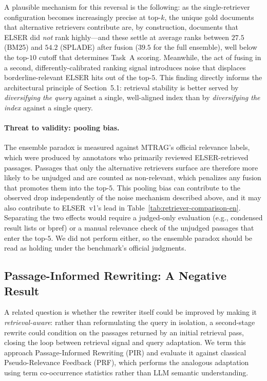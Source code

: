 A plausible mechanism for this reversal is the following: as the single-retriever configuration becomes increasingly precise at top-$k$, the unique gold documents that alternative retrievers contribute are, by construction, documents that ELSER did \emph{not} rank highly---and these settle at average ranks between $27.5$ (BM25) and $54.2$ (SPLADE) after fusion ($39.5$ for the full ensemble), well below the top-$10$ cutoff that determines Task~A scoring. Meanwhile, the act of fusing in a second, differently-calibrated ranking signal introduces noise that displaces borderline-relevant ELSER hits out of the top-$5$. This finding directly informs the architectural principle of Section~5.1: retrieval stability is better served by \emph{diversifying the query} against a single, well-aligned index than by \emph{diversifying the index} against a single query.

\paragraph{Threat to validity: pooling bias.}
\label{sec:pooling-bias}
The ensemble paradox is measured against MTRAG's official relevance labels, which were produced by annotators who primarily reviewed ELSER-retrieved passages. Passages that only the alternative retrievers surface are therefore more likely to be unjudged and are counted as non-relevant, which penalizes any fusion that promotes them into the top-$5$. This pooling bias can contribute to the observed drop independently of the noise mechanism described above, and it may also contribute to ELSER~v1's lead in Table~\ref{tab:retriever-comparison-en}. Separating the two effects would require a judged-only evaluation (e.g., condensed result lists or bpref) or a manual relevance check of the unjudged passages that enter the top-$5$. We did not perform either, so the ensemble paradox should be read as holding under the benchmark's official judgments.

\subsection{Passage-Informed Rewriting: A Negative Result}
\label{sec:pir}

A related question is whether the rewriter itself could be improved by making it \emph{retrieval-aware}: rather than reformulating the query in isolation, a second-stage rewrite could condition on the passages returned by an initial retrieval pass, closing the loop between retrieval signal and query adaptation. We term this approach Passage-Informed Rewriting (PIR) and evaluate it against classical Pseudo-Relevance Feedback (PRF), which performs the analogous adaptation using term co-occurrence statistics rather than LLM semantic understanding.

